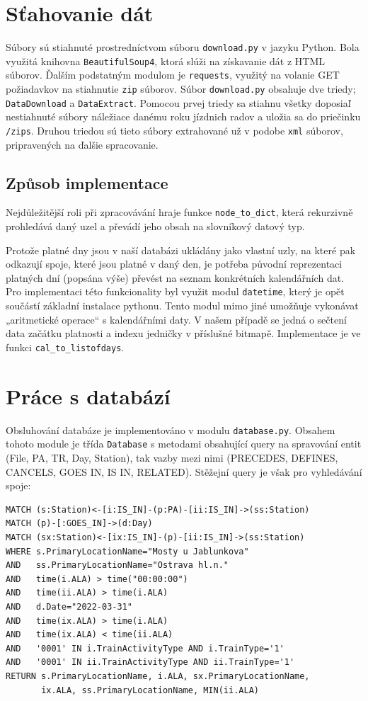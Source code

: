 \documentclass[10pt,xcolor=pdflatex,dvipsnames,table,oneside]{book}
\begin{document}
\section{Sťahovanie dát}
Súbory sú stiahnuté prostredníctvom súboru \verb|download.py| v jazyku Python. Bola využitá knihovna \verb|BeautifulSoup4|, ktorá slúži na získavanie dát z HTML súborov. Ďalším podstatným modulom je \verb|requests|, využitý na volanie GET požiadavkov na stiahnutie \verb|zip| súborov. Súbor \verb|download.py| obsahuje dve triedy; \verb|DataDownload| a \verb|DataExtract|. Pomocou prvej triedy sa stiahnu všetky doposiaľ nestiahnuté súbory náležiace danému roku jízdnich radov a uložia sa do priečinku \verb|/zips|. Druhou triedou sú tieto súbory extrahované už v podobe \verb|xml| súborov, pripravených na ďalšie spracovanie.

\subsection{Způsob implementace}
Nejdůležitější roli při zpracovávání hraje funkce \verb|node_to_dict|, která rekurzivně prohledává daný uzel a převádí jeho obsah na slovníkový datový typ.

Protože platné dny jsou v naší databázi ukládány jako vlastní uzly, na které pak odkazují spoje, které jsou platné v daný den, je potřeba původní reprezentaci platných dní (popsána výše) převést na seznam konkrétních kalendářních dat. Pro implementaci této funkcionality byl využit modul \verb|datetime|, který je opět součástí základní instalace pythonu. Tento modul mimo jiné umožňuje vykonávat „aritmetické operace“ s kalendářními daty. V našem případě se jedná o sečtení data začátku platnosti a indexu jedničky v příslušné bitmapě. Implementace je ve funkci \verb|cal_to_listofdays|.

\section{Práce s databází}
Obsluhování databáze je implementováno v modulu \verb|database.py|. Obsahem tohoto module je třída \verb|Database| s metodami
obsahující query na spravování entit (File, PA, TR, Day, Station), tak vazby mezi nimi (PRECEDES, DEFINES, CANCELS, GOES IN, IS IN, RELATED).
Stěžejní query je však pro vyhledávání spoje:
\begin{verbatim}
MATCH (s:Station)<-[i:IS_IN]-(p:PA)-[ii:IS_IN]->(ss:Station)
MATCH (p)-[:GOES_IN]->(d:Day)
MATCH (sx:Station)<-[ix:IS_IN]-(p)-[ii:IS_IN]->(ss:Station)
WHERE s.PrimaryLocationName="Mosty u Jablunkova"
AND   ss.PrimaryLocationName="Ostrava hl.n."
AND   time(i.ALA) > time("00:00:00")
AND   time(ii.ALA) > time(i.ALA)
AND   d.Date="2022-03-31"
AND   time(ix.ALA) > time(i.ALA)
AND   time(ix.ALA) < time(ii.ALA)
AND   '0001' IN i.TrainActivityType AND i.TrainType='1'
AND   '0001' IN ii.TrainActivityType AND ii.TrainType='1'
RETURN s.PrimaryLocationName, i.ALA, sx.PrimaryLocationName, 
       ix.ALA, ss.PrimaryLocationName, MIN(ii.ALA)
\end{verbatim}
\end{document}
